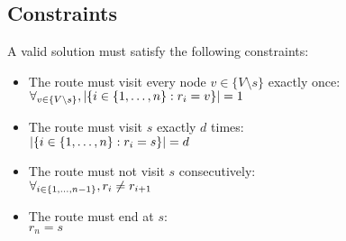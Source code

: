 \subsection{Constraints}\label{subsec:problem-constraints}
A valid solution must satisfy the following constraints:
\begin{itemize}
    \item The route must visit every node $v \in \{V \setminus s\}$ exactly once:\\
    $\forall_{v \in \{V \setminus s\}}, |\{i \in \{1, \mathellipsis, n\}: r_i = v\}| = 1$
    \item The route must visit $s$ exactly $d$ times:\\
    $|\{i \in \{1, \mathellipsis, n\}: r_i = s\}| = d$
    \item The route must not visit $s$ consecutively:\\
    $\forall_{i \in \{1, \mathellipsis, n-1\}}, r_i \neq r_{i+1}$
    \item The route must end at $s$:\\
    $r_n = s$
\end{itemize}
